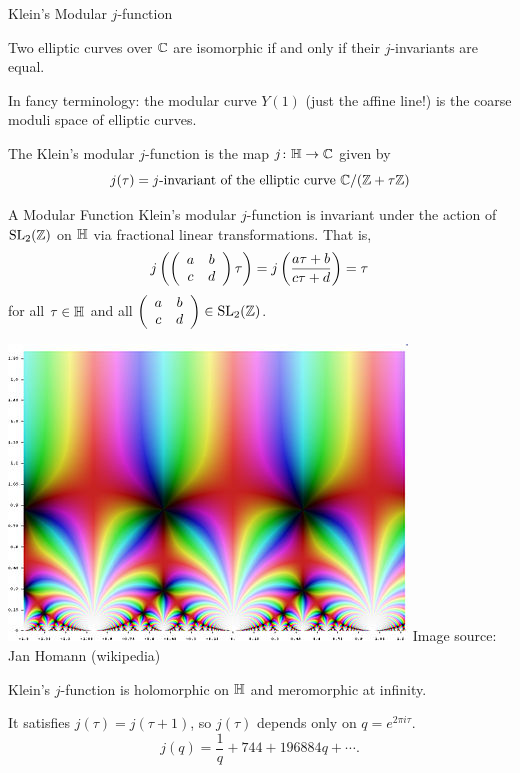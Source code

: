 \documentclass{beamer}
\begin{document}
\begin{frame}{Klein's Modular $j$-function}
  \begin{theorem}
    Two elliptic curves over ${\mathbb{C}}$ are
    isomorphic if and only if their $j$-invariants are equal.
  \end{theorem}

  In fancy terminology: the modular curve $Y(1)$ (just the
  affine line!)
  is the coarse moduli space of elliptic curves.

  \begin{definition}
    The \alert{Klein's modular $j$-function} is the map
    $j\colon{\mathbb{H}}\rightarrow{\mathbb{C}}$ given by
    $$j(\tau) =
    \text{$j$-invariant of the elliptic curve ${\mathbb{C}}/({\mathbb{Z}}+\tau{\mathbb{Z}})$}$$
  \end{definition}  
\end{frame}

\begin{frame}{A Modular Function}
  Klein's modular $j$-function is invariant under the action of
  $\mathrm{SL}_2({\mathbb{Z}})$ on ${\mathbb{H}}$ via fractional linear transformations.
  That is, 
$$j\left(\left( \begin{array}{cc} {a} & {b} \\ {c} & {d} \end{array} \right) \tau\right) = j\left(\frac{a\tau + b}{c\tau +d}\right) =
    \tau$$
  for all $\tau\in{\mathbb{H}}$ and all $\left( \begin{array}{cc} {a} & {b} \\ {c} & {d} \end{array} \right)\in
  \mathrm{SL}_2({\mathbb{Z}})$.

  \begin{minipage}{0.4\linewidth}
    \begin{center}
    \includegraphics[width=\textwidth]{400px-KleinInvariantJ.jpg}
    {\tiny Image source: Jan Homann (wikipedia)}
  \end{center}
\end{minipage}
  \begin{minipage}{0.58\linewidth}
      Klein's $j$-function is
  holomorphic on ${\mathbb{H}}$ and meromorphic at infinity.

  It satisfies  $j(\tau)=j(\tau+1)$, so $j(\tau)$ depends only
  on $q=e^{2\pi i \tau}$. 
  \begin{equation*}
    j(q) = \frac 1q + 744 + 196884q +\cdots. 
  \end{equation*}
  \end{minipage}
\end{frame}
\end{document}
